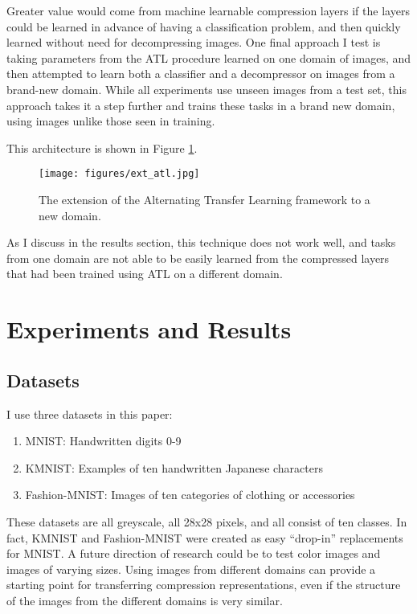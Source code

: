 \documentclass[twoside,11pt]{article}
\begin{document}
Greater value would come from machine learnable compression layers if the layers could
be learned in advance of having a classification problem, and then quickly learned without
need for decompressing images. One final approach I test is taking parameters from the ATL 
procedure learned on one domain of images, and then attempted to learn both a classifier
and a decompressor on images from a brand-new domain. While all experiments use unseen images from a test
set, this approach takes it a step further and trains these tasks in a brand new domain,
using images unlike those seen in training. 

This architecture is shown in Figure \ref{fig:ext_atl}.

\begin{figure}[h]
  \texttt{[image: figures/ext\_atl.jpg]}
  \caption{The extension of the Alternating Transfer Learning framework to a new domain.}
  \label{fig:ext_atl}
\end{figure}

As I discuss in the results section, this technique does not work well, and tasks from 
one domain are not able to be easily learned from the compressed layers that had been trained
using ATL on a different domain. 










\section{Experiments and Results} \label{results}


\subsection{Datasets}

I use three datasets in this paper:

\begin{enumerate}
\item{MNIST: Handwritten digits 0-9 \citep{lecun2010mnist}}
\item{KMNIST: Examples of ten handwritten Japanese characters \citep{clanuwat2018deep}}
\item{Fashion-MNIST: Images of ten categories of clothing or accessories \citep{xiao2017fashion}}
\end{enumerate}

These datasets are all greyscale, all 28x28 pixels, and all consist of ten classes.
In fact, KMNIST and Fashion-MNIST were created as easy ``drop-in'' replacements for MNIST.
A future direction of research could be to test color images and images of varying sizes.
Using images from different domains can provide a starting point for transferring 
compression representations, even if the structure of the images from the different 
domains is very similar.
\end{document}
